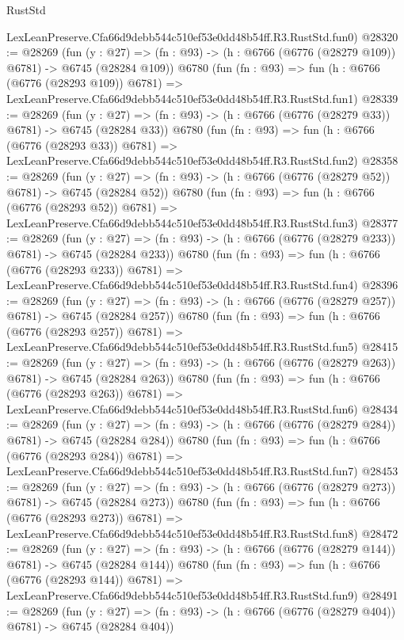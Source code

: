 \begin{lexlean}{RustStd}
\begin{coremodule}
    LexLeanPreserve.Cfa66d9debb544c510ef53e0dd48b54ff.R3.RustStd.fun0)
@28320 := @28269
    (fun (y : @27) => (fn : @93) -> (h : @6766 (@6776 (@28279 @109)) @6781) -> @6745 (@28284 @109))
    @6780
    (fun (fn : @93) =>
    fun (h : @6766 (@6776 (@28293 @109)) @6781) =>
    LexLeanPreserve.Cfa66d9debb544c510ef53e0dd48b54ff.R3.RustStd.fun1)
@28339 := @28269
    (fun (y : @27) => (fn : @93) -> (h : @6766 (@6776 (@28279 @33)) @6781) -> @6745 (@28284 @33))
    @6780
    (fun (fn : @93) =>
    fun (h : @6766 (@6776 (@28293 @33)) @6781) =>
    LexLeanPreserve.Cfa66d9debb544c510ef53e0dd48b54ff.R3.RustStd.fun2)
@28358 := @28269
    (fun (y : @27) => (fn : @93) -> (h : @6766 (@6776 (@28279 @52)) @6781) -> @6745 (@28284 @52))
    @6780
    (fun (fn : @93) =>
    fun (h : @6766 (@6776 (@28293 @52)) @6781) =>
    LexLeanPreserve.Cfa66d9debb544c510ef53e0dd48b54ff.R3.RustStd.fun3)
@28377 := @28269
    (fun (y : @27) => (fn : @93) -> (h : @6766 (@6776 (@28279 @233)) @6781) -> @6745 (@28284 @233))
    @6780
    (fun (fn : @93) =>
    fun (h : @6766 (@6776 (@28293 @233)) @6781) =>
    LexLeanPreserve.Cfa66d9debb544c510ef53e0dd48b54ff.R3.RustStd.fun4)
@28396 := @28269
    (fun (y : @27) => (fn : @93) -> (h : @6766 (@6776 (@28279 @257)) @6781) -> @6745 (@28284 @257))
    @6780
    (fun (fn : @93) =>
    fun (h : @6766 (@6776 (@28293 @257)) @6781) =>
    LexLeanPreserve.Cfa66d9debb544c510ef53e0dd48b54ff.R3.RustStd.fun5)
@28415 := @28269
    (fun (y : @27) => (fn : @93) -> (h : @6766 (@6776 (@28279 @263)) @6781) -> @6745 (@28284 @263))
    @6780
    (fun (fn : @93) =>
    fun (h : @6766 (@6776 (@28293 @263)) @6781) =>
    LexLeanPreserve.Cfa66d9debb544c510ef53e0dd48b54ff.R3.RustStd.fun6)
@28434 := @28269
    (fun (y : @27) => (fn : @93) -> (h : @6766 (@6776 (@28279 @284)) @6781) -> @6745 (@28284 @284))
    @6780
    (fun (fn : @93) =>
    fun (h : @6766 (@6776 (@28293 @284)) @6781) =>
    LexLeanPreserve.Cfa66d9debb544c510ef53e0dd48b54ff.R3.RustStd.fun7)
@28453 := @28269
    (fun (y : @27) => (fn : @93) -> (h : @6766 (@6776 (@28279 @273)) @6781) -> @6745 (@28284 @273))
    @6780
    (fun (fn : @93) =>
    fun (h : @6766 (@6776 (@28293 @273)) @6781) =>
    LexLeanPreserve.Cfa66d9debb544c510ef53e0dd48b54ff.R3.RustStd.fun8)
@28472 := @28269
    (fun (y : @27) => (fn : @93) -> (h : @6766 (@6776 (@28279 @144)) @6781) -> @6745 (@28284 @144))
    @6780
    (fun (fn : @93) =>
    fun (h : @6766 (@6776 (@28293 @144)) @6781) =>
    LexLeanPreserve.Cfa66d9debb544c510ef53e0dd48b54ff.R3.RustStd.fun9)
@28491 := @28269
    (fun (y : @27) => (fn : @93) -> (h : @6766 (@6776 (@28279 @404)) @6781) -> @6745 (@28284 @404))

\end{coremodule}
\end{lexlean}
